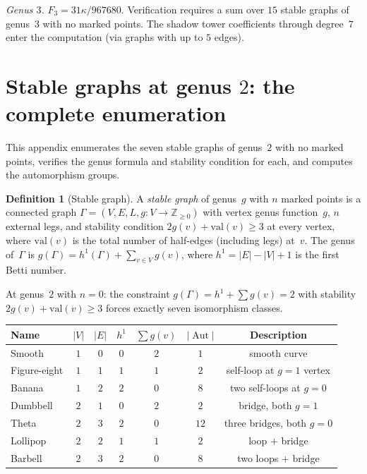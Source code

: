\documentclass[11pt,reqno]{amsart}
\theoremstyle{definition}
\newtheorem{definition}[theorem]{Definition}
\theoremstyle{remark}
\DeclareMathOperator{\Aut}{Aut}
\numberwithin{equation}{section}
\begin{document}
\emph{Genus $3$.}\enspace
$F_3 = 31\kappa/967680$. Verification requires a sum over
$15$ stable graphs of genus~$3$ with no marked points.
The shadow tower coefficients through degree~$7$ enter the
computation (via graphs with up to $5$ edges).


\section{Stable graphs at genus $2$: the complete
enumeration}\label{app:stable-graphs}

This appendix enumerates the seven stable graphs of
genus~$2$ with no marked points, verifies the genus formula
and stability condition for each, and computes the
automorphism groups.

\begin{definition}[Stable graph]\label{def:stable-graph}
A \emph{stable graph} of genus~$g$ with $n$ marked points
is a connected graph $\Gamma = (V, E, L, g\colon V \to
\mathbb{Z}_{\ge 0})$ with vertex genus function~$g$,
$n$ external legs, and stability condition
$2g(v) + \mathrm{val}(v) \ge 3$ at every vertex, where
$\mathrm{val}(v)$ is the total number of half-edges
(including legs) at~$v$. The genus of~$\Gamma$ is
$g(\Gamma) = h^1(\Gamma) + \sum_{v \in V} g(v)$,
where $h^1 = |E| - |V| + 1$ is the first Betti number.
\end{definition}

At genus~$2$ with $n = 0$: the constraint
$g(\Gamma) = h^1 + \sum g(v) = 2$ with stability
$2g(v) + \mathrm{val}(v) \ge 3$ forces exactly seven
isomorphism classes.

\begin{center}
\renewcommand{\arraystretch}{1.3}
\small
\begin{tabular}{lcccccc}
\toprule
Name & $|V|$ & $|E|$ & $h^1$ & $\sum g(v)$
 & $|\Aut|$ & Description \\
\midrule
Smooth
 & $1$ & $0$ & $0$ & $2$ & $1$
 & smooth curve \\
Figure-eight
 & $1$ & $1$ & $1$ & $1$ & $2$
 & self-loop at $g{=}1$ vertex \\
Banana
 & $1$ & $2$ & $2$ & $0$ & $8$
 & two self-loops at $g{=}0$ \\
Dumbbell
 & $2$ & $1$ & $0$ & $2$ & $2$
 & bridge, both $g{=}1$ \\
Theta
 & $2$ & $3$ & $2$ & $0$ & $12$
 & three bridges, both $g{=}0$ \\
Lollipop
 & $2$ & $2$ & $1$ & $1$ & $2$
 & loop $+$ bridge \\
Barbell
 & $2$ & $3$ & $2$ & $0$ & $8$
 & two loops $+$ bridge \\
\bottomrule
\end{tabular}
\end{center}
\end{document}
